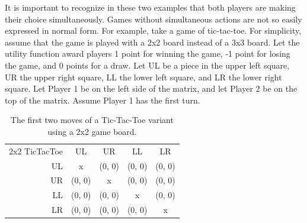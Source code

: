 It is important to recognize in these two examples that both players are making their choice simultaneously. Games without simultaneous actions are not so easily expressed in normal form. For example, take a game of tic-tac-toe. For simplicity, assume that the game is played with a 2x2 board instead of a 3x3 board. Let the utility function award players 1 point for winning the game, -1 point for losing the game, and 0 points for a draw. Let UL be a piece in the upper left square, UR the upper right square, LL the lower left square, and LR the lower right square. Let Player 1 be on the left side of the matrix, and let Player 2 be on the top of the matrix. Assume Player 1 has the first turn.\\
\begin{table}[h]
  \centering
  \begin{tabular}{r | c | c | c | c |}
    \multicolumn{1}{c}{2x2 TicTacToe}&\multicolumn{1}{c}{UL}&\multicolumn{1}{c}{UR}&
    \multicolumn{1}{c}{LL}&\multicolumn{1}{c}{LR}\\ \cline{2-5}
    UL & x & (0, 0) & (0, 0) & (0, 0) \\ \cline{2-5}
    UR & (0, 0) & x & (0, 0) & (0, 0) \\ \cline{2-5}
    LL & (0, 0) & (0, 0) & x & (0, 0) \\ \cline{2-5}
    LR & (0, 0) & (0, 0) & (0, 0) & x \\ \cline{2-5}
  \end{tabular}
  \caption{The first two moves of a Tic-Tac-Toe variant using a 2x2 game board.}
  \label{table:2x2TTT}
\end{table}


